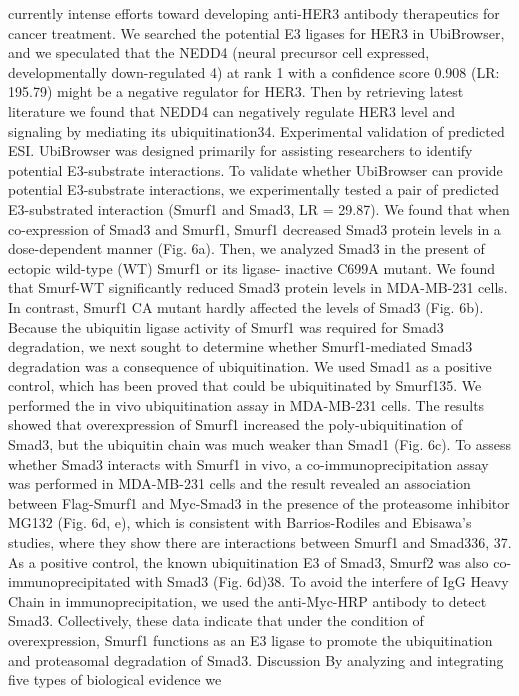 currently intense efforts toward developing anti-HER3 antibody
therapeutics for cancer treatment. We searched the potential E3
ligases for HER3 in UbiBrowser, and we speculated that the NEDD4
(neural precursor cell expressed, developmentally down-regulated
4) at rank 1 with a conﬁdence score 0.908 (LR: 195.79) might be a
negative regulator for HER3. Then by retrieving latest literature we
found that NEDD4 can negatively regulate HER3 level and
signaling by mediating its ubiquitination34.
Experimental validation of predicted ESI. UbiBrowser was
designed primarily for assisting researchers to identify potential
E3-substrate interactions. To validate whether UbiBrowser can
provide potential E3-substrate interactions, we experimentally
tested a pair of predicted E3-substrated interaction (Smurf1 and
Smad3, LR = 29.87). We found that when co-expression of Smad3
and Smurf1, Smurf1 decreased Smad3 protein levels in a
dose-dependent manner (Fig. 6a). Then, we analyzed Smad3 in
the present of ectopic wild-type (WT) Smurf1 or its ligase-
inactive C699A mutant. We found that Smurf-WT signiﬁcantly
reduced Smad3 protein levels in MDA-MB-231 cells. In contrast,
Smurf1 CA mutant hardly affected the levels of Smad3 (Fig. 6b).
Because the ubiquitin ligase activity of Smurf1 was required for
Smad3 degradation, we next sought to determine whether
Smurf1-mediated Smad3 degradation was a consequence of
ubiquitination. We used Smad1 as a positive control, which has
been proved that could be ubiquitinated by Smurf135. We
performed the in vivo ubiquitination assay in MDA-MB-231 cells.
The results showed that overexpression of Smurf1 increased the
poly-ubiquitination of Smad3, but the ubiquitin chain was much
weaker than Smad1 (Fig. 6c). To assess whether Smad3 interacts
with Smurf1 in vivo, a co-immunoprecipitation assay was
performed in MDA-MB-231 cells and the result revealed an
association between Flag-Smurf1 and Myc-Smad3 in the presence
of the proteasome inhibitor MG132 (Fig. 6d, e), which is
consistent with Barrios-Rodiles and Ebisawa’s studies, where they
show there are interactions between Smurf1 and Smad336, 37. As a
positive control, the known ubiquitination E3 of Smad3, Smurf2
was also co-immunoprecipitated with Smad3 (Fig. 6d)38. To
avoid the interfere of IgG Heavy Chain in immunoprecipitation,
we
used
the
anti-Myc-HRP
antibody
to
detect
Smad3.
Collectively, these data indicate that under the condition of
overexpression, Smurf1 functions as an E3 ligase to promote the
ubiquitination and proteasomal degradation of Smad3.
Discussion
By analyzing and integrating ﬁve types of biological evidence we
